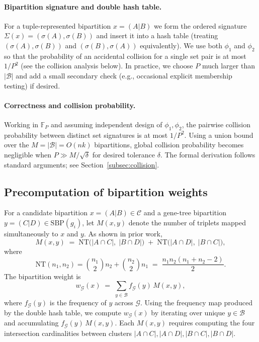 \documentclass[10pt,a4paper]{article}
\begin{document}
\begin{enumerate}
\paragraph{Bipartition signature and double hash table.} For a tuple-represented bipartition $x=(A\!|\!B)$ we form the ordered signature $\Sigma(x)=(\sigma(A),\sigma(B))$ and insert it into a hash table (treating $(\sigma(A),\sigma(B))$ and $(\sigma(B),\sigma(A))$ equivalently). We use both $\phi_1$ and $\phi_2$ so that the probability of an accidental collision for a single set pair is at most $1/P^2$ (see the collision analysis below). In practice, we choose $P$ much larger than $|\mathcal{B}|$ and add a small secondary check (e.g., occasional explicit membership testing) if desired.

\paragraph{Correctness and collision probability.} Working in $\mathbb{F}_P$ and assuming independent design of $\phi_1,\phi_2$, the pairwise collision probability between distinct set signatures is at most $1/P^2$. Using a union bound over the $M=|\mathcal{B}|=O(nk)$ bipartitions, global collision probability becomes negligible when $P\gg M/\sqrt{\delta}$ for desired tolerance $\delta$. The formal derivation follows standard arguments; see Section~\ref{subsec:collision}.

\subsection{Precomputation of bipartition weights}
\label{subsec:weights}

For a candidate bipartition $x=(A\!|\!B)\in\mathcal{C}$ and a gene-tree bipartition $y=(C\!|\!D)\in\mathrm{SBP}(g_i)$, let $M(x,y)$ denote the number of triplets mapped simultaneously to $x$ and $y$. As shown in prior work,
\begin{equation}\label{eq:Mxy}
M(x,y) \;=\; \mathrm{NT}\big(|A\cap C|,\;|B\cap D|\big) \;+\; \mathrm{NT}\big(|A\cap D|,\;|B\cap C|\big),
\end{equation}
where
\[
\mathrm{NT}(n_1,n_2)=\binom{n_1}{2}n_2+\binom{n_2}{2}n_1 \;=\; \frac{n_1n_2(n_1+n_2-2)}{2}.
\]
The bipartition weight is
\[
w_{\mathcal{G}}(x) \;=\; \sum_{y\in\mathcal{B}} f_{\mathcal{G}}(y)\, M(x,y),
\]
where $f_{\mathcal{G}}(y)$ is the frequency of $y$ across $\mathcal{G}$. Using the frequency map produced by the double hash table, we compute $w_{\mathcal{G}}(x)$ by iterating over unique $y\in\mathcal{B}$ and accumulating $f_{\mathcal{G}}(y)\,M(x,y)$. Each $M(x,y)$ requires computing the four intersection cardinalities between clusters $|A\cap C|,|A\cap D|,|B\cap C|,|B\cap D|$.


\end{enumerate}
\end{document}
